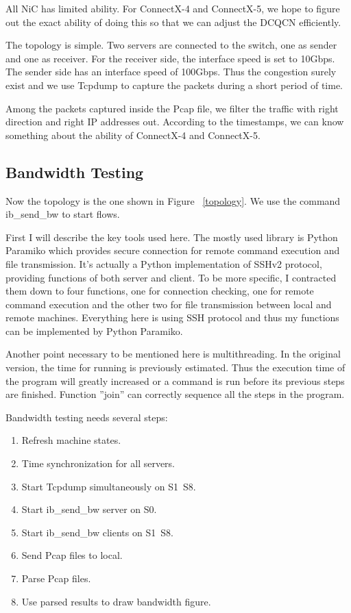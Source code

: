 \documentclass[12pt,a4paper]{article}
\begin{document}
All NiC has limited ability. For ConnectX-4 and ConnectX-5, we hope to figure out the exact ability of doing this so that we can adjust the DCQCN efficiently.

The topology is simple. Two servers are connected to the switch, one as sender and one as receiver.
For the receiver side, the interface speed is set to 10Gbps. The sender side has an interface speed of 100Gbps.
Thus the congestion surely exist and we use Tcpdump to capture the packets during a short period of time.

Among the packets captured inside the Pcap file, we filter the traffic with right direction and right IP addresses out.
According to the timestamps, we can know something about the ability of ConnectX-4 and ConnectX-5.

\subsection{Bandwidth Testing}

Now the topology is the one shown in Figure ~\ref{topology}.
We use the command ib\_send\_bw to start flows.


First I will describe the key tools used here.
The mostly used library is Python Paramiko which provides secure connection for remote command execution and file transmission.
It's actually a Python implementation of SSHv2 protocol, providing functions of both server and client.
To be more specific, I contracted them down to four functions, one for connection checking, one for remote command execution and the other two for file
transmission between local and remote machines.
Everything here is using SSH protocol and thus my functions can be implemented by Python Paramiko.

Another point necessary to be mentioned here is multithreading. In the original version, the time for running is previously estimated.
Thus the execution time of the program will greatly increased or a command is run before its previous steps are finished.
Function ''join'' can correctly sequence all the steps in the program.

Bandwidth testing needs several steps:
\begin{enumerate}
	\item Refresh machine states.
	\item Time synchronization for all servers.
	\item Start Tcpdump simultaneously on S1~S8.
	\item Start ib\_send\_bw server on S0.
	\item Start ib\_send\_bw clients on S1~S8.
	\item Send Pcap files to local.
	\item Parse Pcap files.
	\item Use parsed results to draw bandwidth figure.
\end{enumerate}
\end{document}

